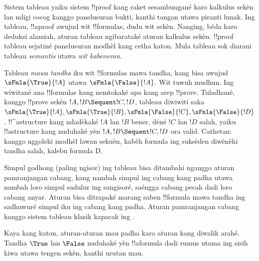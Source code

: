 \documentclass[../../../include/open-logic-section]{subfiles}
\begin{document}


Sistem tableau yaiku sistem !!{proof} kang raket
sesambungané karo kalkulus sekèn lan mligi cocog
kanggo panelusuran bukti, kanthi tangan utawa piranti
lunak. Ing tableau, !!a{proof} awujud wit !!{formula}s,
dudu wit sekèn. Nanging, béda karo deduksi alamiah,
aturan tableau ngibarataké aturan kalkulus sekèn.
!!{proof} tableau sejatiné panelusuran modhèl kang
cetha katon. Mula tableau sok diarani tableau
\emph{semantis} utawa \emph{wit kabeneran}.

Tableau \emph{mawa tandha} iku wit !!{formula}s mawa
tandha, kang bisa awujud $\sFmla{\True}{!A}$ utawa
$\sFmla{\False}{!A}$. Wit tuwuh mudhun. Ing wiwitané
ana !!{formula}s kang nemtokaké apa kang arep
!!{prove}. Tuladhané, kanggo !!{prove} sekèn
$!A, !B \Sequent !C, !D$, tableau diwiwiti saka
$\sFmla{\True}{!A}, \sFmla{\True}{!B},
\sFmla{\False}{!C}, \sFmla{\False}{!D}$.
!!^a{structure} kang ndadèkaké $!A$ lan $!B$
bener, déné $!C$ lan $!D$ salah, yaiku
!!a{structure} kang nuduhaké yèn
$!A, !B \Sequent !C, !D$ ora valid.
Cathetan: kanggo nggoleki modhèl lawan sekuèn, kabèh formula ing suksèden diwènèhi tandha salah, kalebu formula D.

Simpul godhong (paling ngisor) ing tableau bisa
ditambahi nganggo aturan pamranjangan cabang, kang
nambah simpul ing cabang kang padha utawa nambah loro
simpul sadulur ing sangisoré, saéngga cabang pecah
dadi loro cabang anyar. Aturan bisa ditrapaké marang
saben !!{formula} mawa tandha ing sadhuwuré simpul
iku ing cabang kang padha. Aturan pamranjangan cabang
kanggo sistem tableau klasik  kapacak ing
.



Kaya kang katon, aturan-aturan mau padha karo aturan
 kang diwalik arahé. Tandha $\True$
lan $\False$ nuduhaké yèn !!a{formula} dadi
rumus utama ing sisih kiwa utawa tengen
sekèn, kanthi urutan mau.
\end{document}
